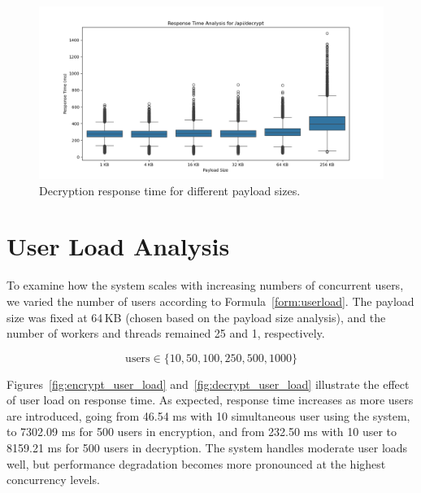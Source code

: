 \documentclass[cic,tc,english]{iiufrgs}
\numberwithin{algorithm}{chapter}
\begin{document}
            \begin{figure}
                \centering
                \includegraphics[width=\textwidth]{images/phase2/response_time_api_decrypt.png}
                \caption{Decryption response time for different payload sizes.}
                \label{fig:decrypt_payload_size}
            \end{figure}

        \section{User Load Analysis}
        \label{subsec:user_load_analysis}

            To examine how the system scales with increasing numbers of concurrent users, we varied the number of users according to Formula~\ref{form:userload}. The payload size was fixed at 64\,KB (chosen based on the payload size analysis), and the number of workers and threads remained 25 and 1, respectively.

            \begin{equation}
            \label{form:userload}
                \text{users} \in \{10, 50, 100, 250, 500, 1000\}
            \end{equation}

            Figures~\ref{fig:encrypt_user_load} and~\ref{fig:decrypt_user_load} illustrate the effect of user load on response time. As expected, response time increases as more users are introduced, going from 46.54 ms with 10 simultaneous user using the system, to 7302.09 ms for 500 users in encryption, and from 232.50 ms with 10 user to 8159.21 ms for 500 users in decryption. The system handles moderate user loads well, but performance degradation becomes more pronounced at the highest concurrency levels.
\end{document}
